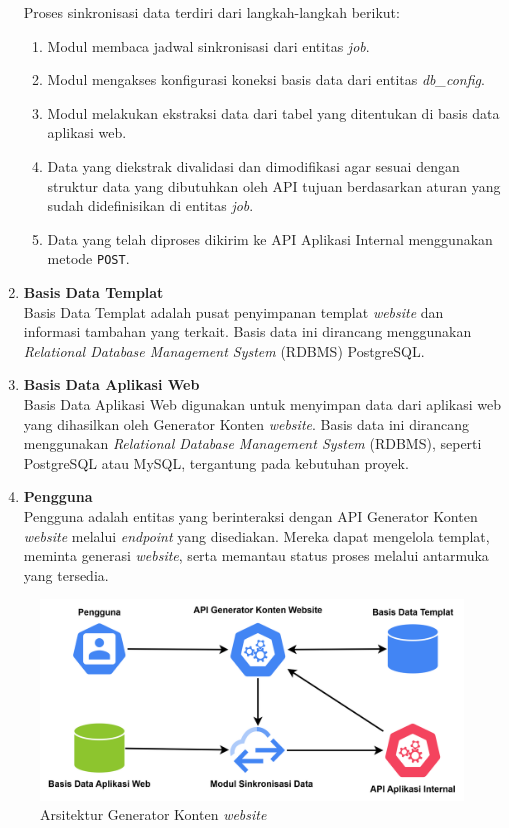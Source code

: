 \begin{enumerate}[label=\alph*.]
        Proses sinkronisasi data terdiri dari langkah-langkah berikut:
        \begin{enumerate}[label=\arabic*.]
            \item Modul membaca jadwal sinkronisasi dari entitas \textit{job}.
            \item Modul mengakses konfigurasi koneksi basis data dari entitas \textit{db\_config}.
            \item Modul melakukan ekstraksi data dari tabel yang ditentukan di basis data aplikasi web.
            \item Data yang diekstrak divalidasi dan dimodifikasi agar sesuai dengan struktur data yang dibutuhkan oleh API tujuan berdasarkan aturan yang sudah didefinisikan di entitas \textit{job}.
            \item Data yang telah diproses dikirim ke API Aplikasi Internal menggunakan metode \texttt{POST}.
        \end{enumerate}
        
    \item \textbf{Basis Data Templat}\\ 
        Basis Data Templat adalah pusat penyimpanan templat \textit{website} dan informasi tambahan yang terkait. Basis data ini dirancang menggunakan \textit{Relational Database Management System} (RDBMS) PostgreSQL.

    \item \textbf{Basis Data Aplikasi Web}\\
        Basis Data Aplikasi Web digunakan untuk menyimpan data dari aplikasi web yang dihasilkan oleh Generator Konten \textit{website}. Basis data ini dirancang menggunakan \textit{Relational Database Management System} (RDBMS), seperti PostgreSQL atau MySQL, tergantung pada kebutuhan proyek.

    \item \textbf{Pengguna}\\
        Pengguna adalah entitas yang berinteraksi dengan API Generator Konten \textit{website} melalui \textit{endpoint} yang disediakan. Mereka dapat mengelola templat, meminta generasi \textit{website}, serta memantau status proses melalui antarmuka yang tersedia.
            
\end{enumerate}

\begin{figure}[H]
    \centering
    \includegraphics[width=0.8\linewidth]{figures/ArsitekturGeneratorKontenWebsite.png}
    \caption{Arsitektur Generator Konten \textit{website}}
    \label{fig:ArsitekturGeneratorKontenWebsite}
\end{figure}

